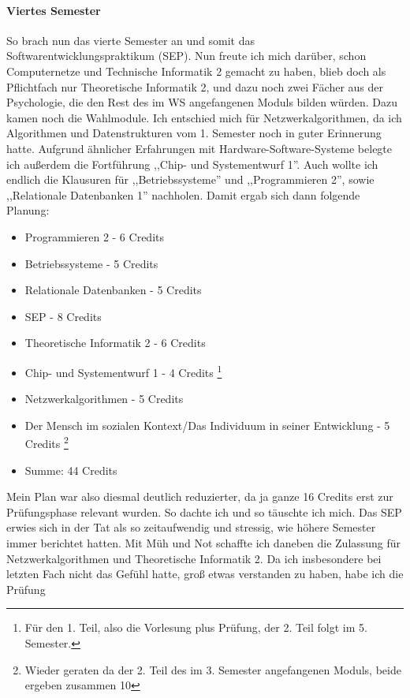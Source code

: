 \paragraph{Viertes Semester}
So brach nun das vierte Semester an und somit das
Softwarentwicklungspraktikum (SEP). Nun freute ich mich darüber, schon
Computernetze und Technische Informatik 2 gemacht zu haben, blieb doch
als Pflichtfach nur Theoretische Informatik 2, und dazu noch zwei
Fächer aus der Psychologie, die den Rest des im WS angefangenen Moduls
bilden würden. Dazu kamen noch die Wahlmodule. Ich entschied
mich für Netzwerkalgorithmen, da ich Algorithmen und Datenstrukturen
vom 1. Semester noch in guter Erinnerung hatte. Aufgrund ähnlicher
Erfahrungen mit Hardware-Software-Systeme belegte ich außerdem die
Fortführung ,,Chip- und Systementwurf 1''.  Auch wollte ich endlich
die Klausuren für ,,Betriebssysteme'' und ,,Programmieren 2'', sowie
,,Relationale Datenbanken 1''
nachholen. Damit ergab sich dann folgende Planung:
\begin{itemize}
 \item Programmieren 2 - 6 Credits
 \item Betriebssysteme - 5 Credits
\item Relationale Datenbanken - 5 Credits
\item SEP - 8 Credits
\item Theoretische Informatik 2 - 6 Credits
\item Chip- und Systementwurf 1 - 4 Credits \footnote{Für den 1. Teil,
    also die Vorlesung plus Prüfung, der 2. Teil folgt im 5. Semester.}
\item Netzwerkalgorithmen       - 5 Credits
\item Der Mensch im sozialen Kontext/Das Individuum in seiner Entwicklung - 5 Credits \footnote{Wieder geraten da der 2. Teil
    des im 3. Semester angefangenen Moduls, beide ergeben zusammen 10}
\item Summe: 44  Credits
\end{itemize}
Mein Plan war also diesmal deutlich reduzierter, da ja ganze 16 Credits
erst zur Prüfungsphase relevant wurden. So dachte ich und so täuschte
ich mich. Das SEP erwies sich in der Tat als so zeitaufwendig und
stressig, wie höhere Semester immer berichtet hatten. Mit Müh und Not
schaffte ich daneben die Zulassung für Netzwerkalgorithmen und
Theoretische Informatik 2. Da ich insbesondere bei letzten Fach nicht
das Gefühl hatte, groß etwas verstanden zu haben, habe ich die Prüfung
